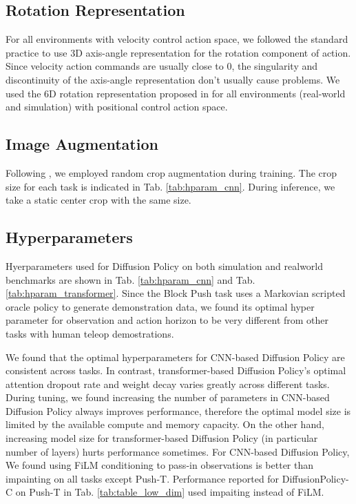 \subsection{Rotation Representation}
For all environments with velocity control action space, we followed the standard practice \cite{robomimic} to use 3D axis-angle representation for the rotation component of action. Since velocity action commands are usually close to 0, the singularity and discontinuity of the axis-angle representation don't usually cause problems. We used the 6D rotation representation proposed in \citet{zhou2019continuity} for all environments (real-world and simulation) with positional control action space. 

\subsection{Image Augmentation}
Following \citet{robomimic}, we employed random crop augmentation during training. The crop size for each task is indicated in Tab. \ref{tab:hparam_cnn}. During inference, we take a static center crop with the same size.

\subsection{Hyperparameters}
Hyerparameters used for Diffusion Policy on both simulation and realworld benchmarks are shown in Tab. \ref{tab:hparam_cnn} and Tab. \ref{tab:hparam_transformer}. Since the Block Push task uses a Markovian scripted oracle policy to generate demonstration data, we found its optimal hyper parameter for observation and action horizon to be very different from other tasks with human teleop demostrations.

We found that the optimal hyperparameters for CNN-based Diffusion Policy are consistent across tasks. In contrast, transformer-based Diffusion Policy's optimal attention dropout rate and weight decay varies greatly across different tasks. During tuning, we found increasing the number of parameters in CNN-based Diffusion Policy always improves performance, therefore the optimal model size is limited by the available compute and memory capacity. On the other hand, increasing model size for transformer-based Diffusion Policy (in particular number of layers) hurts performance sometimes. For CNN-based Diffusion Policy, We found using FiLM conditioning to pass-in observations is better than impainting on all tasks except Push-T. Performance reported for DiffusionPolicy-C on Push-T in Tab. \ref{tab:table_low_dim} used impaiting instead of FiLM.

